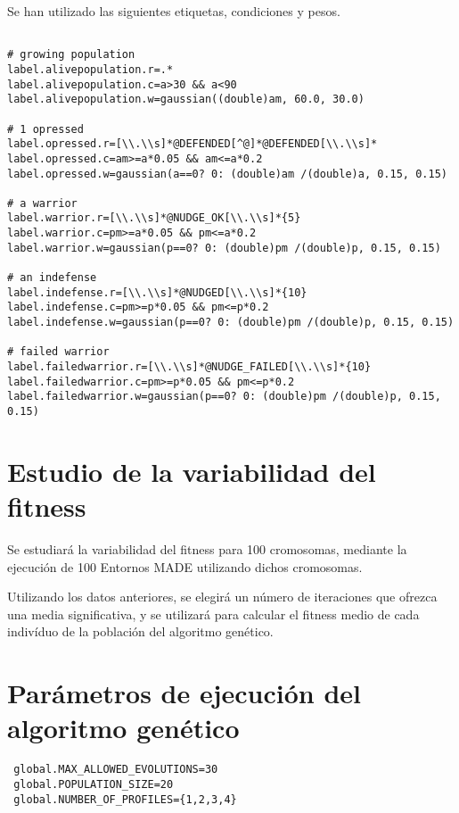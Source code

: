 Se han utilizado las siguientes etiquetas, condiciones y pesos. 

\begin{verbatim}

# growing population
label.alivepopulation.r=.*
label.alivepopulation.c=a>30 && a<90
label.alivepopulation.w=gaussian((double)am, 60.0, 30.0)

# 1 opressed
label.opressed.r=[\\.\\s]*@DEFENDED[^@]*@DEFENDED[\\.\\s]*
label.opressed.c=am>=a*0.05 && am<=a*0.2
label.opressed.w=gaussian(a==0? 0: (double)am /(double)a, 0.15, 0.15)

# a warrior
label.warrior.r=[\\.\\s]*@NUDGE_OK[\\.\\s]*{5}
label.warrior.c=pm>=a*0.05 && pm<=a*0.2
label.warrior.w=gaussian(p==0? 0: (double)pm /(double)p, 0.15, 0.15)

# an indefense
label.indefense.r=[\\.\\s]*@NUDGED[\\.\\s]*{10}
label.indefense.c=pm>=p*0.05 && pm<=p*0.2
label.indefense.w=gaussian(p==0? 0: (double)pm /(double)p, 0.15, 0.15)

# failed warrior
label.failedwarrior.r=[\\.\\s]*@NUDGE_FAILED[\\.\\s]*{10}
label.failedwarrior.c=pm>=p*0.05 && pm<=p*0.2
label.failedwarrior.w=gaussian(p==0? 0: (double)pm /(double)p, 0.15, 0.15)

\end{verbatim}



\section{Estudio de la variabilidad del fitness}

Se estudiará la variabilidad del fitness para 100 cromosomas, mediante la
ejecución de 100 Entornos MADE utilizando dichos cromosomas.

Utilizando los datos anteriores, se elegirá un número de iteraciones que
ofrezca una media significativa, y se utilizará para calcular el fitness medio
de cada indivíduo de la población del algoritmo genético.


\section{Parámetros de ejecución del algoritmo genético}

\begin{verbatim}
 global.MAX_ALLOWED_EVOLUTIONS=30
 global.POPULATION_SIZE=20
 global.NUMBER_OF_PROFILES={1,2,3,4}
\end{verbatim}
